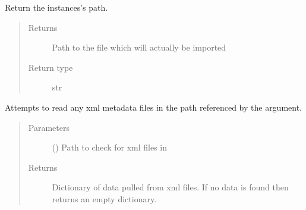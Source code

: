 \documentclass[letterpaper,10pt,english]{sphinxmanual}
\begin{document}
\begin{fulllineitems}
\begin{fulllineitems}
\begin{quote}
\begin{description}
\end{description}\end{quote}

\end{fulllineitems}


\begin{fulllineitems}
\label{\detokenize{polo.windows:polo.windows.run_importer.ImportCandidate.path}}
Return the {\hyperref[\detokenize{polo.windows:polo.windows.run_importer.ImportCandidate}]{}} instances’s path.
\begin{quote}\begin{description}
\item[{Returns}] \leavevmode
Path to the file which will actually be imported

\item[{Return type}] \leavevmode
str

\end{description}\end{quote}

\end{fulllineitems}


\begin{fulllineitems}
\label{\detokenize{polo.windows:polo.windows.run_importer.ImportCandidate.read_xmldata}}
Attempts to read any xml metadata files in the path referenced by
the  argument.
\begin{quote}\begin{description}
\item[{Parameters}] \leavevmode
{} () \textendash{} Path to check for xml files in

\item[{Returns}] \leavevmode
Dictionary of data pulled from xml files. If no data is found
then returns an empty dictionary.


\end{description}
\end{quote}
\end{fulllineitems}
\end{fulllineitems}
\end{document}
